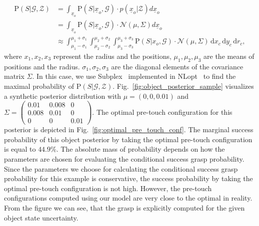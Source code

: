 \begin{equation}
\begin{split}
 \text{P}(S | \mathcal{G} ,\mathcal{Z}) 
    &= \int_{\underline{x}_o} \text{P} (S | \underline{x}_o, \mathcal{G} )\cdot p(\underline{x}_o|\mathcal{Z}) d\underline{x}_o \\
    &=  \int_{\underline{x}_o} \text{P} (S | \underline{x}_o, \mathcal{G} )\cdot \mathcal{N}(\mu, \Sigma) d\underline{x}_o  \\
    &\approx \int_{\mu_1 - \sigma_1}^{\mu_1 + \sigma_1} \int_{\mu_2 - \sigma_2}^{\mu_2 + \sigma_2} \int_{\mu_3 - \sigma_3}^{\mu_3 + \sigma_3} \text{P} (S | x_{o},  \mathcal{G} )\cdot \mathcal{N}(\mu, \Sigma) \,  \text{d}x_{c} \, \text{d}y_{c} \, \text{d}r_{c}, 
\label{e_grasp_success}
\end{split}
\end{equation}
where $x_{1}, x_{2}, x_{3} $ represent the radius and the positions, $\mu_1, \mu_2, \mu_3$ are the means of positions and the radius. $\sigma_1, \sigma_2, \sigma_3$ are the diagonal elements of the covariance matrix $\Sigma$. In this case, we use Subplex~\cite{Rowan1990} implemented in NLopt~\cite{Johnson2010} to find the maximal probability of $\text{P}(S | \mathcal{G} ,\mathcal{Z})$. Fig.~\ref{fig:object_posterior_sample} visualizes a synthetic posterior distribution   with $\mu = (0, 0 , 0.01)$ and $
\Sigma = 
\begin{pmatrix}
0.01 & 0.008  & 0 \\ 
0.008 & 0.01  & 0 \\
0 & 0  & 0.01
\end{pmatrix}
$. The optimal pre-touch configuration for this posterior is depicted in Fig.~\ref{fig:optimal_pre_touch_conf}. The marginal success probability of this object posterior by taking the optimal pre-touch configuration is equal to $44.9 \%$. The absolute mass of probability depends on how the parameters are chosen for evaluating the conditional success grasp probability. Since the parameters we choose for calculating the conditional success grasp probability for this example is conservative, the success probability by taking the optimal pre-touch configuration is not high. However, the pre-touch configurations computed using our model are very close to the optimal in reality. From the figure we can see, that the grasp is explicitly computed for the given object state uncertainty. 
